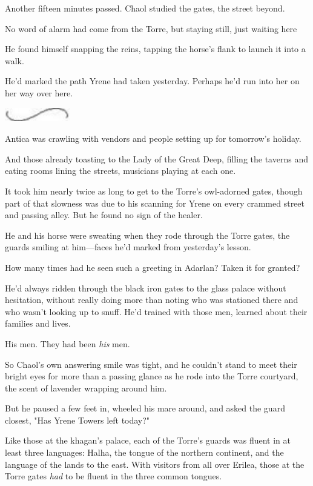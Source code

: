 Another fifteen minutes passed.
Chaol studied the gates, the street beyond.

No word of alarm had come from the Torre, but staying still, just waiting here 

He found himself snapping the reins, tapping the horse's flank to launch it into a walk.

He'd marked the path Yrene had taken yesterday.
Perhaps he'd run into her on her way over here.

\begin{center}
	\includegraphics[width=1.12in,height=0.24in]{images/seperator}
\end{center}

Antica was crawling with vendors and people setting up for tomorrow's holiday.

And those already toasting to the Lady of the Great Deep, filling the taverns and eating rooms lining the streets, musicians playing at each one.

It took him nearly twice as long to get to the Torre's owl-adorned gates, though part of that slowness was due to his scanning for Yrene on every crammed street and passing alley.
But he found no sign of the healer.

He and his horse were sweating when they rode through the Torre gates, the guards smiling at him---faces he'd marked from yesterday's lesson.

How many times had he seen such a greeting in Adarlan?
Taken it for granted?

He'd always ridden through the black iron gates to the glass palace without hesitation, without really doing more than noting who was stationed there and who wasn't looking up to snuff.
He'd trained with those men, learned about their families and lives.

His men.
They had been \emph{his} men.

So Chaol's own answering smile was tight, and he couldn't stand to meet their bright eyes for more than a passing glance as he rode into the Torre courtyard, the scent of lavender wrapping around him.

But he paused a few feet in, wheeled his mare around, and asked the guard closest, "Has Yrene Towers left today?"

Like those at the khagan's palace, each of the Torre's guards was fluent in at least three languages: Halha, the tongue of the northern continent, and the language of the lands to the east.
With visitors from all over Erilea, those at the Torre gates \emph{had} to be fluent in the three common tongues.

